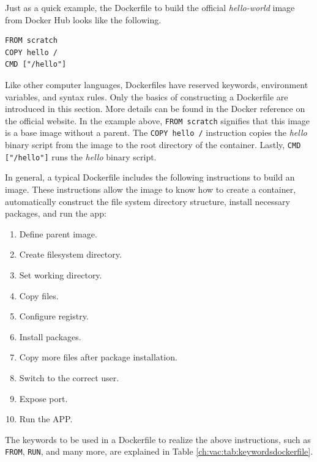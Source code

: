 Just as a quick example, the Dockerfile to build the official \textit{hello-world} image from Docker Hub looks like the following.
\begin{lstlisting}
FROM scratch
COPY hello /
CMD ["/hello"]
\end{lstlisting}
Like other computer languages, Dockerfiles have reserved keywords, environment variables, and syntax rules. Only the basics of constructing a Dockerfile are introduced in this section. More details can be found in the Docker reference on the official website. In the example above, \verb|FROM scratch| signifies that this image is a base image without a parent. The \verb|COPY hello /| instruction copies the \textit{hello} binary script from the image to the root directory of the container. Lastly, \verb|CMD ["/hello"]| runs the \textit{hello} binary script.

In general, a typical Dockerfile includes the following instructions to build an image. These instructions allow the image to know how to create a container, automatically construct the file system directory structure, install necessary packages, and run the app:
\begin{enumerate}[(1)]
  \item Define parent image.
  \item Create filesystem directory.
  \item Set working directory.
  \item Copy files.
  \item Configure registry.
  \item Install packages.
  \item Copy more files after package installation.
  \item Switch to the correct user.
  \item Expose port.
  \item Run the APP.
\end{enumerate}

The keywords to be used in a Dockerfile to realize the above instructions, such as \verb|FROM|, \verb|RUN|, and many more, are explained in Table \ref{ch:vac:tab:keywordsdockerfile}.

